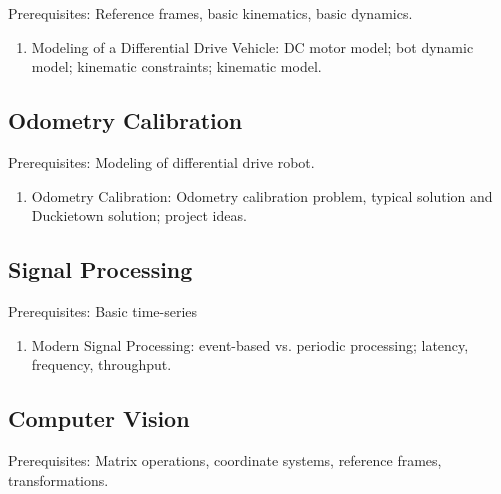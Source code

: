 \documentclass[12pt]{article}
\begin{document}
Prerequisites: Reference frames, basic kinematics, basic dynamics.

\begin{enumerate}

	\item Modeling of a Differential Drive Vehicle: DC motor model; bot dynamic model; kinematic constraints; kinematic model.

\end{enumerate}


\subsection{Odometry Calibration}

Prerequisites: Modeling of differential drive robot.

\begin{enumerate}

	\item Odometry Calibration: Odometry calibration problem, typical solution and Duckietown solution; project ideas.

\end{enumerate}


\subsection{Signal Processing}

Prerequisites: Basic time-series

\begin{enumerate}

	\item Modern Signal Processing: event-based vs. periodic processing; latency, frequency, throughput.

\end{enumerate}


\subsection{Computer Vision}

Prerequisites: Matrix operations, coordinate systems, reference frames, transformations.
\end{document}

